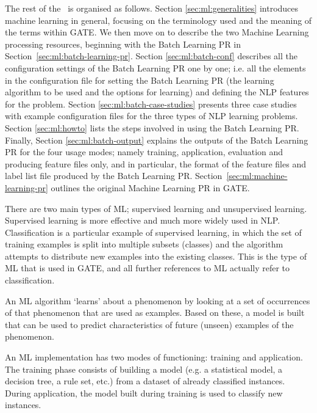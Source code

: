 The rest of the \chapthing\ is organised as follows. Section
\ref{sec:ml:generalities} introduces machine learning in general, focusing on the
terminology used and the meaning of the terms within GATE. We then move on to
describe the two Machine Learning processing resources, beginning with the Batch
Learning PR in Section~\ref{sec:ml:batch-learning-pr}. Section
\ref{sec:ml:batch-conf} describes all the configuration settings of the Batch
Learning PR one by one; i.e. all the elements in the configuration file for
setting the Batch Learning PR (the learning algorithm to be used and the options
for learning) and defining the NLP features for the problem. Section
\ref{sec:ml:batch-case-studies} presents three case studies with example
configuration files for the three types of NLP learning problems. Section
\ref{sec:ml:howto} lists the steps involved in using the Batch Learning PR.
Finally, Section \ref{sec:ml:batch-output} explains the outputs of the Batch
Learning PR for the four usage modes; namely training, application, evaluation
and producing feature files only, and in particular, the format of the feature
files and label list file produced by the Batch Learning PR.
Section~\ref{sec:ml:machine-learning-pr} outlines the original Machine Learning
PR in GATE.


There are two main types of ML; supervised learning and unsupervised learning.
Supervised learning is more effective and much more widely used in NLP.
Classification is a particular example of supervised learning, in which the set
of training examples is split into multiple subsets (classes) and the algorithm
attempts to distribute new examples into the existing classes. This is the type
of ML that is used in GATE, and all further references to ML actually refer to
classification.

An ML algorithm `learns' about a phenomenon by looking at a set of occurrences
of that phenomenon that are used as examples. Based on these, a model is built
that can be used to predict characteristics of future (unseen) examples of the
phenomenon.

An ML implementation has two modes of functioning: training and application.  The
training phase consists of building a model (e.g. a statistical model, a decision
tree, a rule set, etc.) from a dataset of already classified instances.  During
application, the model built during training is used to classify new instances.


